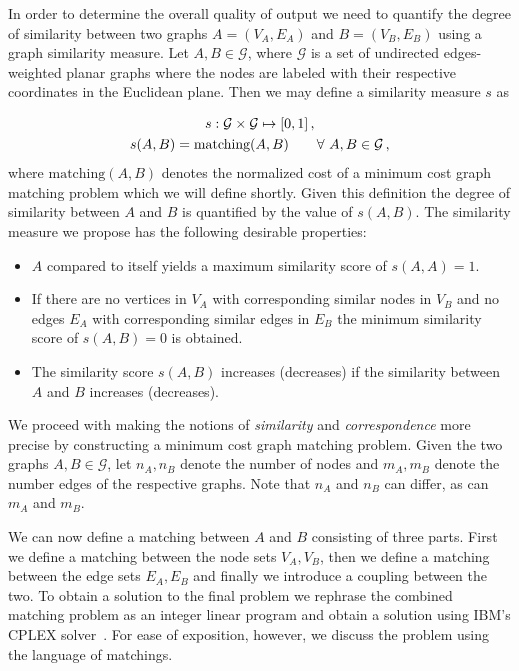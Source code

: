 		In order to determine the overall quality of \NEFIs output we need to quantify the degree of similarity between two graphs $A = (V_A, E_A)$ and $B = (V_B, E_B)$ using a graph similarity measure. Let $A, B \in \mathcal{G}$, where $\mathcal{G}$ is a set of undirected edges-weighted planar graphs where the nodes are labeled with their respective coordinates in the Euclidean plane. Then we may define a similarity measure $s$ as
		
		\begin{gather}
		s : \mathcal{G} \times \mathcal{G} \mapsto [0,1]\,, \notag \\
		s(A,B) = \text{matching}(A,B) \quad \quad \forall \ A, B \in \mathcal{G} \,,
		\end{gather}
		where $\text{matching}(A,B)$ denotes the normalized cost of a minimum cost graph matching problem which we will define shortly. Given this definition the degree of similarity between $A$ and $B$ is quantified by the value of $s(A,B)$. The similarity measure we propose has the following desirable properties:


		\begin{itemize}
			\item $A$ compared to itself yields a maximum similarity score of $s(A,A) = 1$.
			\item If there are no vertices in $V_A$ with corresponding similar nodes in $V_B$ and no edges $E_A$ with corresponding similar edges in $E_B$ the minimum similarity score of $s(A,B) = 0$ is obtained.
			\item The similarity score $s(A,B)$ increases (decreases) if the similarity between $A$ and $B$ increases (decreases).
		\end{itemize}

		We proceed with making the notions of \emph{similarity} and \emph{correspondence} more precise by constructing a minimum cost graph matching problem. Given the two graphs $A,B \in \mathcal{G}$, let $n_A,n_B$ denote the number of nodes and $m_A,m_B$ denote the number edges of the respective graphs. Note that $n_A$ and $n_B$ can differ, as can $m_A$ and $m_B$.

		We can now define a matching between $A$ and $B$ consisting of three parts. First we define a matching between the node sets $V_A, V_B$, then we define a matching between the edge sets $E_A, E_B$ and finally we introduce a coupling between the two. To obtain a solution to the final problem we rephrase the combined matching problem as an integer linear program and obtain a solution using IBM's CPLEX solver~\cite{cplex2005high}. For ease of exposition, however, we discuss the problem using the language of matchings.

